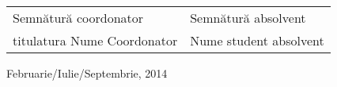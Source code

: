 \documentclass[12pt,a4paper,twoside]{report}
\begin{document}
\begin{titlepage}
\vspace{0.5cm}

\begin{center}

%
\begin{tabularx}{\textwidth}{lR}
Semnătură coordonator & Semnătură absolvent \\
titulatura Nume Coordonator & Nume student absolvent \\
\end{tabularx}

Februarie/Iulie/Septembrie, 2014\\

\end{center}

\end{titlepage}


\begin{titlepage}
\phantom{1}
\end{titlepage}
\end{document}
